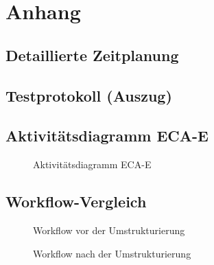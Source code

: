 \section{Anhang}
\subsection{Detaillierte Zeitplanung}
\label{app:Zeitplanung}

\clearpage

\subsection{Testprotokoll (Auszug)}
\label{app:IssueLog}




\clearpage

\subsection{Aktivitätsdiagramm ECA-E}
\begin{figure}[htb]
    \centering
    \label{Aktivitaetsdiagramm}
    \caption{Aktivitätsdiagramm ECA-E}
\end{figure}
\clearpage

\subsection{Workflow-Vergleich}
\label{WorkflowVergleich}

\begin{figure}[htb]
    \caption{Workflow vor der Umstrukturierung}
    \label{WorkflowVergleich1}
\end{figure}

\begin{figure}[htb]
    \caption{Workflow nach der Umstrukturierung}
    \label{WorkflowVergleich2}
\end{figure}


\clearpage